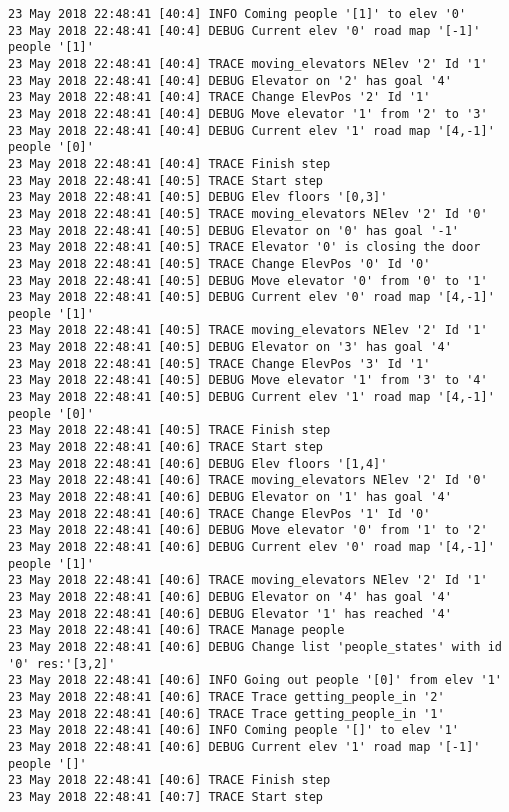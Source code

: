 \begin{lstlisting}[basicstyle=\scriptsize]
23 May 2018 22:48:41 [40:4] INFO Coming people '[1]' to elev '0'
23 May 2018 22:48:41 [40:4] DEBUG Current elev '0' road map '[-1]' people '[1]'
23 May 2018 22:48:41 [40:4] TRACE moving_elevators NElev '2' Id '1'
23 May 2018 22:48:41 [40:4] DEBUG Elevator on '2' has goal '4'
23 May 2018 22:48:41 [40:4] TRACE Change ElevPos '2' Id '1'
23 May 2018 22:48:41 [40:4] DEBUG Move elevator '1' from '2' to '3'
23 May 2018 22:48:41 [40:4] DEBUG Current elev '1' road map '[4,-1]' people '[0]'
23 May 2018 22:48:41 [40:4] TRACE Finish step
23 May 2018 22:48:41 [40:5] TRACE Start step
23 May 2018 22:48:41 [40:5] DEBUG Elev floors '[0,3]'
23 May 2018 22:48:41 [40:5] TRACE moving_elevators NElev '2' Id '0'
23 May 2018 22:48:41 [40:5] DEBUG Elevator on '0' has goal '-1'
23 May 2018 22:48:41 [40:5] TRACE Elevator '0' is closing the door
23 May 2018 22:48:41 [40:5] TRACE Change ElevPos '0' Id '0'
23 May 2018 22:48:41 [40:5] DEBUG Move elevator '0' from '0' to '1'
23 May 2018 22:48:41 [40:5] DEBUG Current elev '0' road map '[4,-1]' people '[1]'
23 May 2018 22:48:41 [40:5] TRACE moving_elevators NElev '2' Id '1'
23 May 2018 22:48:41 [40:5] DEBUG Elevator on '3' has goal '4'
23 May 2018 22:48:41 [40:5] TRACE Change ElevPos '3' Id '1'
23 May 2018 22:48:41 [40:5] DEBUG Move elevator '1' from '3' to '4'
23 May 2018 22:48:41 [40:5] DEBUG Current elev '1' road map '[4,-1]' people '[0]'
23 May 2018 22:48:41 [40:5] TRACE Finish step
23 May 2018 22:48:41 [40:6] TRACE Start step
23 May 2018 22:48:41 [40:6] DEBUG Elev floors '[1,4]'
23 May 2018 22:48:41 [40:6] TRACE moving_elevators NElev '2' Id '0'
23 May 2018 22:48:41 [40:6] DEBUG Elevator on '1' has goal '4'
23 May 2018 22:48:41 [40:6] TRACE Change ElevPos '1' Id '0'
23 May 2018 22:48:41 [40:6] DEBUG Move elevator '0' from '1' to '2'
23 May 2018 22:48:41 [40:6] DEBUG Current elev '0' road map '[4,-1]' people '[1]'
23 May 2018 22:48:41 [40:6] TRACE moving_elevators NElev '2' Id '1'
23 May 2018 22:48:41 [40:6] DEBUG Elevator on '4' has goal '4'
23 May 2018 22:48:41 [40:6] DEBUG Elevator '1' has reached '4'
23 May 2018 22:48:41 [40:6] TRACE Manage people
23 May 2018 22:48:41 [40:6] DEBUG Change list 'people_states' with id '0' res:'[3,2]'
23 May 2018 22:48:41 [40:6] INFO Going out people '[0]' from elev '1'
23 May 2018 22:48:41 [40:6] TRACE Trace getting_people_in '2'
23 May 2018 22:48:41 [40:6] TRACE Trace getting_people_in '1'
23 May 2018 22:48:41 [40:6] INFO Coming people '[]' to elev '1'
23 May 2018 22:48:41 [40:6] DEBUG Current elev '1' road map '[-1]' people '[]'
23 May 2018 22:48:41 [40:6] TRACE Finish step
23 May 2018 22:48:41 [40:7] TRACE Start step

\end{lstlisting}
